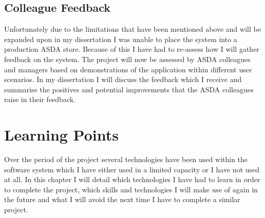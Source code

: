 \documentclass[a4paper,11pt]{report}
\begin{document}
\section{Colleague Feedback}
Unfortunately due to the limitations that have been mentioned above and will be expanded upon in my dissertation I was unable to place the system into a production ASDA store.
Because of this I have had to re-assess how I will gather feedback on the system. The project will now be assessed by ASDA colleagues and managers based on demonstrations of the application within different user scenarios. 
In my dissertation I will discuss the feedback which I receive and summarise the positives and potential improvements that the ASDA colleagues raise in their feedback.


\chapter{Learning Points}
Over the period of the project several technologies have been used within the software system
which I have either used in a limited capacity or I have not used at all. In this chapter I will
detail which technologies I have had to learn in order to complete the project, which skills and 
technologies I will make use of again in the future and what I will avoid the next time I have to 
complete a similar project.

\end{document}
